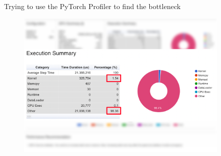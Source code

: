 \documentclass[compress,aspectratio=169]{beamer}
\begin{document}
\begin{frame}{Trying to use the PyTorch Profiler to find the bottleneck}
    \vspace{-1em}
    \begin{center}
    \begin{figure}
        \includegraphics[width=0.9\textwidth]{../../data/scap_gtx1080_profiler-torch_sample-points_14650750_execution-time}
    \end{figure}
    \end{center}
\end{frame}
\end{document}
